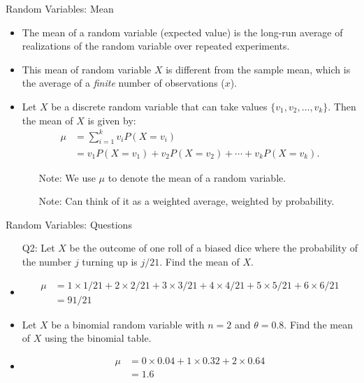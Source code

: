 \documentclass[10pt, handout, xcolor=table]{beamer}
\newcommand*\themecol{\usebeamercolor[fg]{structure}}
\begin{document}
\begin{frame}{Random Variables: Mean}
\begin{itemize}
\setlength{\itemsep}{15pt}
\item<1-> The {\themecol mean of a random variable} (expected value) is the long-run average of realizations of the random variable over repeated experiments.
\item<2-> This mean of random variable $X$ is different from the sample mean, which is the average of a \emph{finite} number of observations ($x$).
\item<3-> Let $X$ be a discrete random variable that can take values $\{v_1,v_2,\dots, v_k\}$. Then the mean of $X$ is given by:
\begin{align*} 
\mu &= \sum_{i = 1}^k v_i P(X = v_i)\\
&= v_1P(X = v_1) + v_2P(X = v_2) + \cdots + v_kP(X = v_k).
\end{align*}
\begin{itemize}
\item[Note:] We use $\mu$ to denote the mean of a random variable.
\item[Note:] Can think of it as a weighted average, weighted by probability.
\end{itemize}
\end{itemize}
\end{frame}

\begin{frame}{Random Variables: Questions}
\begin{itemize}
\setlength{\itemsep}{6pt}
\item[Q2:] Let $X$ be the outcome of one roll of a biased dice where the probability of the number $j$ turning up is $j/21$. Find the mean of $X$.
\item<2->[A2:] {\color{red} \begin{align*}
\mu &= 1 \times 1/21 + 2 \times 2/21 + 3 \times 3/21 + 4 \times 4/21 + 5 \times 5/21 + 6\times 6/21 \\
&= 91/21
\end{align*}}
\vspace{-0.5cm}
\item<3->[Q3:] Let $X$ be a binomial random variable with $n = 2$ and $\theta = 0.8$. Find the mean of $X$ using the binomial table.
\vspace{0.5cm}
\item<4->[A3:] {\color{red} 
\begin{align*}
\mu &= 0 \times 0.04 + 1 \times 0.32 + 2\times 0.64 \\
&= 1.6
\end{align*}}
\vspace{-0.5cm}
\end{itemize}
\end{frame}
\end{document}
